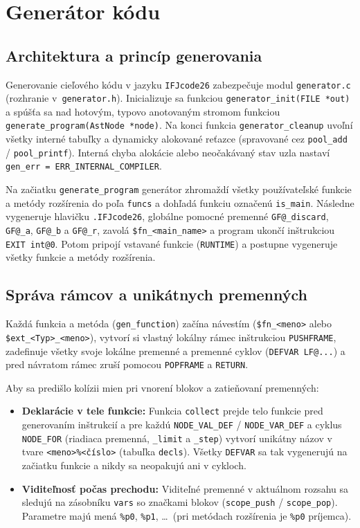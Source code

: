 \section{Generátor kódu}

\subsection{Architektura a princíp generovania}
Generovanie cieľového kódu v jazyku \texttt{IFJcode26} zabezpečuje modul \texttt{generator.c} (rozhranie v~\texttt{generator.h}). Inicializuje sa funkciou \texttt{generator\_init(FILE~*out)} a spúšťa sa nad hotovým, typovo anotovaným stromom funkciou \texttt{generate\_program(AstNode~*node)}. Na konci funkcia \texttt{generator\_cleanup} uvoľní všetky interné tabuľky a dynamicky alokované reťazce (spravované cez \texttt{pool\_add} / \texttt{pool\_printf}). Interná chyba alokácie alebo neočakávaný stav uzla nastaví \texttt{gen\_err = ERR\_INTERNAL\_COMPILER}.

Na začiatku \texttt{generate\_program} generátor zhromaždí všetky používateľské funkcie a metódy rozšírenia do poľa \texttt{funcs} a dohľadá funkciu označenú \texttt{is\_main}. Následne vygeneruje hlavičku \texttt{.IFJcode26}, globálne pomocné premenné \texttt{GF@\_discard}, \texttt{GF@\_a}, \texttt{GF@\_b} a \texttt{GF@\_r}, zavolá \texttt{\$fn\_<main\_name>} a program ukončí inštrukciou \texttt{EXIT int@0}. Potom pripojí vstavané funkcie (\texttt{RUNTIME}) a postupne vygeneruje všetky funkcie a metódy rozšírenia.

\subsection{Správa rámcov a unikátnych premenných}
Každá funkcia a metóda (\texttt{gen\_function}) začína návestím (\texttt{\$fn\_<meno>} alebo \texttt{\$ext\_<Typ>\_<meno>}), vytvorí si vlastný lokálny rámec inštrukciou \texttt{PUSHFRAME}, zadefinuje všetky svoje lokálne premenné a premenné cyklov (\texttt{DEFVAR LF@...}) a pred návratom rámec zruší pomocou \texttt{POPFRAME} a \texttt{RETURN}.

Aby sa predišlo kolízii mien pri vnorení blokov a zatieňovaní premenných:
\begin{itemize}
    \item \textbf{Deklarácie v tele funkcie:} Funkcia \texttt{collect} prejde telo funkcie pred generovaním inštrukcií a pre každú \texttt{NODE\_VAL\_DEF} / \texttt{NODE\_VAR\_DEF} a cyklus \texttt{NODE\_FOR} (riadiaca premenná, \texttt{\_limit} a \texttt{\_step}) vytvorí unikátny názov v tvare \texttt{<meno>\%<číslo>} (tabuľka \texttt{decls}). Všetky \texttt{DEFVAR} sa tak vygenerujú na začiatku funkcie a nikdy sa neopakujú ani v cykloch.
    \item \textbf{Viditeľnosť počas prechodu:} Viditeľné premenné v aktuálnom rozsahu sa sledujú na zásobníku \texttt{vars} so značkami blokov (\texttt{scope\_push} / \texttt{scope\_pop}). Parametre majú mená \texttt{\%p0}, \texttt{\%p1}, \dots\ (pri metódach rozšírenia je \texttt{\%p0} príjemca).
\end{itemize}

